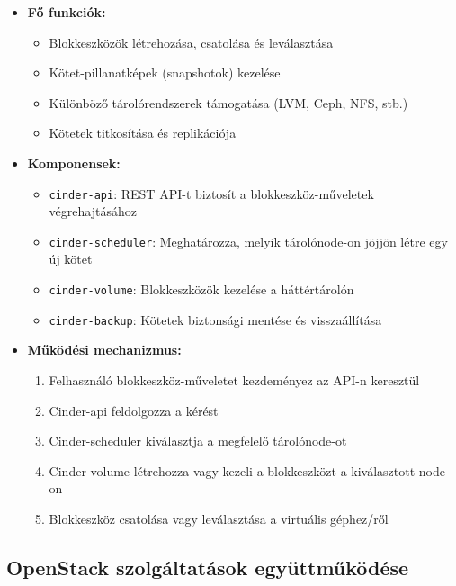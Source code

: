 \documentclass[a4paper,12pt]{article}
\begin{document}
    \begin{itemize}
        \item \textbf{Fő funkciók:}
        \begin{itemize}
            \item Blokkeszközök létrehozása, csatolása és leválasztása
            \item Kötet-pillanatképek (snapshotok) kezelése
            \item Különböző tárolórendszerek támogatása (LVM, Ceph, NFS, stb.)
            \item Kötetek titkosítása és replikációja
        \end{itemize}

        \item \textbf{Komponensek:}
        \begin{itemize}
            \item \texttt{cinder-api}: REST API-t biztosít a blokkeszköz-műveletek végrehajtásához
            \item \texttt{cinder-scheduler}: Meghatározza, melyik tárolónode-on jöjjön létre egy új kötet
            \item \texttt{cinder-volume}: Blokkeszközök kezelése a háttértárolón
            \item \texttt{cinder-backup}: Kötetek biztonsági mentése és visszaállítása
        \end{itemize}

        \item \textbf{Működési mechanizmus:}
        \begin{enumerate}
            \item Felhasználó blokkeszköz-műveletet kezdeményez az API-n keresztül
            \item Cinder-api feldolgozza a kérést
            \item Cinder-scheduler kiválasztja a megfelelő tárolónode-ot
            \item Cinder-volume létrehozza vagy kezeli a blokkeszközt a kiválasztott node-on
            \item Blokkeszköz csatolása vagy leválasztása a virtuális géphez/ről
        \end{enumerate}
    \end{itemize}

    \subsection{OpenStack szolgáltatások együttműködése}
\end{document}
